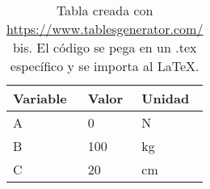 \begin{table}[H]
	\centering
	\begin{tabular}{@{}lll@{}}
		\toprule
		Variable & Valor & Unidad \\ \midrule
		A        & 0    & N      \\
		B        & 100   & kg     \\
		C        & 20     & cm     \\ \bottomrule
	\end{tabular}
	\caption[Tabla creada con \url{https://www.tablesgenerator.com/} bis]{Tabla creada con \url{https://www.tablesgenerator.com/} bis. El código se pega en un .tex específico y se importa al \LaTeX.}
	\label{tab:tabla-2}
\end{table}